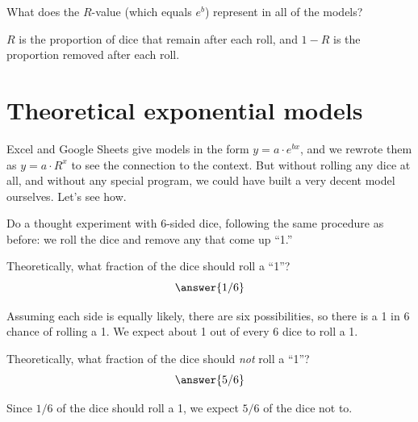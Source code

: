 \documentclass[12pt]{ximera}
\begin{document}
\begin{problem}
What does the $R$-value (which equals $e^{b}$) represent in all of the models?
\begin{freeResponse}
\end{freeResponse}
\begin{solution}
$R$ is the proportion of dice that remain after each roll, and $1 - R$ is the
proportion removed after each roll.
\end{solution}
\end{problem}

\section*{Theoretical exponential models}

Excel and Google Sheets give models in the form $y = a \cdot e^{bx}$, and we rewrote
them as $y = a \cdot R^{x}$ to see the connection to the context. But without rolling
any dice at all, and without any special program, we could have built a very decent
model ourselves. Let's see how.

Do a thought experiment with 6-sided dice, following the same procedure as before: we
roll the dice and remove any that come up ``1.''

\begin{problem}
Theoretically, what fraction of the dice should roll a ``1''?
\[
\answer{1/6}
\]
\begin{solution}
Assuming each side is equally likely, there are six possibilities, so there is a 1 in
6 chance of rolling a 1. We expect about 1 out of every 6 dice to roll a 1.
\end{solution}
\end{problem}

\begin{problem}
Theoretically, what fraction of the dice should \emph{not} roll a ``1''?
\[
\answer{5/6}
\]
\begin{solution}
Since $1/6$ of the dice should roll a 1, we expect $5/6$ of the dice not to.
\end{solution}
\end{problem}
\end{document}
